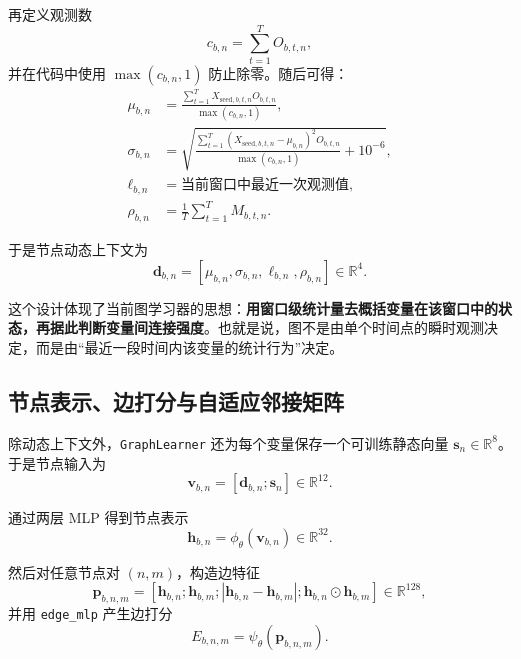 \documentclass[UTF8]{ctexart}
\begin{document}
再定义观测数
\begin{equation}
    c_{b,n} = \sum_{t=1}^{T} O_{b,t,n},
\end{equation}
并在代码中使用 \(\max(c_{b,n},1)\) 防止除零。随后可得：
\begin{align}
    \mu_{b,n} &= \frac{\sum_{t=1}^{T} X_{\text{seed},b,t,n} O_{b,t,n}}{\max(c_{b,n},1)}, \\
    \sigma_{b,n} &= \sqrt{
        \frac{\sum_{t=1}^{T}\left(X_{\text{seed},b,t,n}-\mu_{b,n}\right)^2 O_{b,t,n}}{\max(c_{b,n},1)}
        + 10^{-6}
    }, \\
    \ell_{b,n} &= \text{当前窗口中最近一次观测值}, \\
    \rho_{b,n} &= \frac{1}{T}\sum_{t=1}^{T} M_{b,t,n}.
\end{align}

于是节点动态上下文为
\begin{equation}
    \bm{d}_{b,n} = [\mu_{b,n},\sigma_{b,n},\ell_{b,n},\rho_{b,n}] \in \mathbb{R}^{4}.
\end{equation}

这个设计体现了当前图学习器的思想：\textbf{用窗口级统计量去概括变量在该窗口中的状态，再据此判断变量间连接强度}。也就是说，图不是由单个时间点的瞬时观测决定，而是由“最近一段时间内该变量的统计行为”决定。

\subsection{节点表示、边打分与自适应邻接矩阵}

除动态上下文外，\texttt{GraphLearner} 还为每个变量保存一个可训练静态向量 \(\bm{s}_n \in \mathbb{R}^{8}\)。于是节点输入为
\begin{equation}
    \bm{v}_{b,n} = [\bm{d}_{b,n};\bm{s}_n] \in \mathbb{R}^{12}.
\end{equation}

通过两层 MLP 得到节点表示
\begin{equation}
    \bm{h}_{b,n} = \phi_{\theta}(\bm{v}_{b,n}) \in \mathbb{R}^{32}.
\end{equation}

然后对任意节点对 \((n,m)\)，构造边特征
\begin{equation}
    \bm{p}_{b,n,m} =
    \left[
        \bm{h}_{b,n};
        \bm{h}_{b,m};
        |\bm{h}_{b,n}-\bm{h}_{b,m}|;
        \bm{h}_{b,n}\odot \bm{h}_{b,m}
    \right]
    \in \mathbb{R}^{128},
\end{equation}
并用 \texttt{edge\_mlp} 产生边打分
\begin{equation}
    E_{b,n,m} = \psi_{\theta}(\bm{p}_{b,n,m}).
\end{equation}
\end{document}
